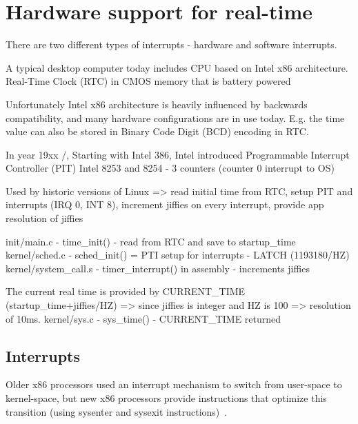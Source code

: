 
\chapter{Hardware support for real-time}

There are two different types of interrupts - hardware and software interrupts.

A typical desktop computer today includes CPU based on Intel x86 architecture.
Real-Time Clock (RTC) in CMOS memory that is battery powered

Unfortunately Intel x86 architecture is heavily influenced by backwards compatibility,
and many hardware configurations are in use today.
E.g. the time value can also be stored in Binary Code Digit (BCD) encoding in RTC.

In year 19xx /, Starting with Intel 386,
Intel introduced
Programmable Interrupt Controller (PIT) Intel 8253 and 8254 - 3 counters (counter 0 interrupt to OS)


Used by historic versions of Linux
=> read initial time from RTC, setup PIT and interrupts (IRQ 0, INT 8), increment jiffies on every interrupt, provide app resolution of jiffies

init/main.c - time\_init() - read from RTC and save to startup\_time
kernel/sched.c - sched\_init() = PTI setup for interrupts - LATCH (1193180/HZ)
kernel/system\_call.s - timer\_interrupt() in assembly - increments jiffies

The current real time is provided by CURRENT\_TIME (startup\_time+jiffies/HZ) => since jiffies is integer and HZ is 100 => resolution of 10ms.
kernel/sys.c - sys\_time() - CURRENT\_TIME returned


\section{Interrupts}
Older x86 processors used an interrupt mechanism to switch from
user-space to kernel-space, but new x86 processors provide instructions
that optimize this transition (using sysenter and sysexit instructions)~\cite{ibm-linux-system-calls}.
